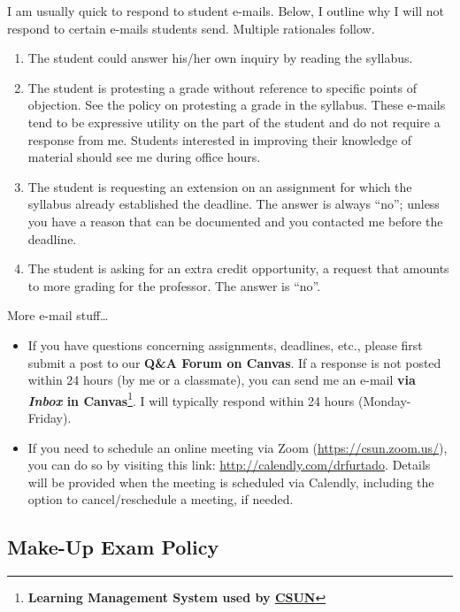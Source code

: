 \documentclass[11pt,]{article}
\providecommand{\tightlist}{%
  \setlength{\itemsep}{0pt}\setlength{\parskip}{0pt}}
\begin{document}
I am usually quick to respond to student e-mails. Below, I outline why I
will not respond to certain e-mails students send. Multiple rationales
follow.

\begin{enumerate}
\def\labelenumi{\arabic{enumi}.}
\tightlist
\item
  The student could answer his/her own inquiry by reading the syllabus.
\item
  The student is protesting a grade without reference to specific points
  of objection. See the policy on protesting a grade in the syllabus.
  These e-mails tend to be expressive utility on the part of the student
  and do not require a response from me. Students interested in
  improving their knowledge of material should see me during office
  hours.
\item
  The student is requesting an extension on an assignment for which the
  syllabus already established the deadline. The answer is always
  ``no''; unless you have a reason that can be documented and you
  contacted me before the deadline.
\item
  The student is asking for an extra credit opportunity, a request that
  amounts to more grading for the professor. The answer is ``no''.
\end{enumerate}

More e-mail stuff\ldots{}

\begin{itemize}
\item
  If you have questions concerning assignments, deadlines, etc., please
  first submit a post to our \textbf{Q\&A Forum on Canvas}. If a
  response is not posted within 24 hours (by me or a classmate), you can
  send me an e-mail \textbf{via \emph{Inbox} in Canvas}\footnote{\textbf{Learning
    Management System used by
    \href{https://www.csun.edu/it/canvas}{CSUN}}}. I will typically
  respond within 24 hours (Monday-Friday).
\item
  If you need to schedule an online meeting via Zoom
  (\url{https://csun.zoom.us/}), you can do so by visiting this link:
  \url{http://calendly.com/drfurtado}. Details will be provided when the
  meeting is scheduled via Calendly, including the option to
  cancel/reschedule a meeting, if needed.
\end{itemize}

\hypertarget{make-up-exam-policy}{%
\subsection{Make-Up Exam Policy}\label{make-up-exam-policy}}
\end{document}
